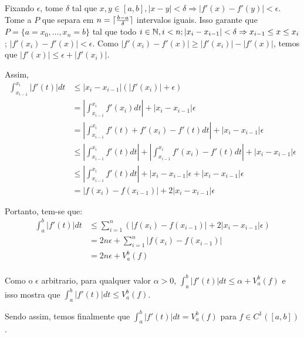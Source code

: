 Fixando $\epsilon$, tome $\delta$ tal que $x,y \in [a,b], |x-y| < \delta \Rightarrow |f'(x) - f'(y)| < \epsilon$. Tome \tambem a \particao $P$ que separa em $n = \lceil\frac{b-a}{\delta}\rceil$ intervalos iguais. Isso garante que $P = \{a=x_0,\ldots,x_n=b\}$ \eh tal que todo \mbox{$i\in\mathbb{N},i<n;|x_i - x_{i-1}| < \delta \Rightarrow x_{i-1} \leq x \leq x_i$}; $|f'(x_i) - f'(x)| < \epsilon$. Como $|f'(x_i) - f'(x)| \ge |f'(x_i)| - |f'(x)|$, temos \tambem que $|f'(x)| \le \epsilon + |f'(x_i)|$.

Assim,
\begin{align*}
	\int_{x_{i-1}}^{x_i} |f'(t)|dt &\le |x_i-x_{i-1}|(|f'(x_i)| + \epsilon) \\
	&= |\int_{x_{i-1}}^{x_i} f'(x_i)dt| + |x_i-x_{i-1}|\epsilon \\
	&= |\int_{x_{i-1}}^{x_i} f'(t) + f'(x_i) - f'(t)dt| + |x_i-x_{i-1}|\epsilon \\
	&\le |\int_{x_{i-1}}^{x_i} f'(t) dt|  + |\int_{x_{i-1}}^{x_i} f'(x_i) - f'(t)dt| + |x_i-x_{i-1}|\epsilon \\
	&\le |\int_{x_{i-1}}^{x_i} f'(t) dt|  + |x_i-x_{i-1}|\epsilon + |x_i-x_{i-1}|\epsilon \\
	&= |f(x_i) - f(x_{i-1})| + 2|x_i-x_{i-1}|\epsilon
\end{align*}

Portanto, tem-se que:
\begin{align*}
	\int_{a}^{b} |f'(t)|dt &\le \sum_{i=1}^{n} (|f(x_i) - f(x_{i-1})| + 2|x_i-x_{i-1}|\epsilon) \\
	&= 2n\epsilon + \sum_{i=1}^{n} |f(x_i) - f(x_{i-1})| \\
	&= 2n\epsilon + V_a^b (f) \\
\end{align*}

Como o $\epsilon$ \eh arbitrario, para qualquer valor $\alpha > 0$, $	\int_{a}^{b} |f'(t)|dt \le \alpha + V_a^b (f)$ e isso mostra que $\int_{a}^{b} |f'(t)|dt \le V_a^b (f)$.

Sendo assim, temos finalmente que $\int_{a}^{b} |f'(t)|dt = V_a^b (f)$ para $f \in C^1([a,b])$.






